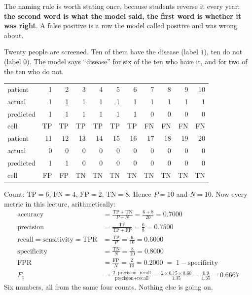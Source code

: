 \documentclass[11pt]{article}
\newcommand{\TP}{\mathrm{TP}}
\newcommand{\FP}{\mathrm{FP}}
\newcommand{\TN}{\mathrm{TN}}
\newcommand{\FN}{\mathrm{FN}}
\newcommand{\TPR}{\mathrm{TPR}}
\newcommand{\FPR}{\mathrm{FPR}}
\begin{document}
The naming rule is worth stating once, because students reverse it every year:
\textbf{the second word is what the model said, the first word is whether it was
right}. A false positive is a row the model called positive and was wrong about.

\begin{worked}
Twenty people are screened. Ten of them have the disease (label $1$), ten do
not (label $0$). The model says ``disease'' for six of the ten who have it, and
for two of the ten who do not.

\smallskip
\begin{center}\footnotesize
\begin{tabular}{@{}lrrrrrrrrrr@{}}
\toprule
patient  & 1&2&3&4&5&6&7&8&9&10\\
actual   & 1&1&1&1&1&1&1&1&1&1\\
predicted& 1&1&1&1&1&1&0&0&0&0\\
cell     & TP&TP&TP&TP&TP&TP&FN&FN&FN&FN\\
\midrule
patient  & 11&12&13&14&15&16&17&18&19&20\\
actual   & 0&0&0&0&0&0&0&0&0&0\\
predicted& 1&1&0&0&0&0&0&0&0&0\\
cell     & FP&FP&TN&TN&TN&TN&TN&TN&TN&TN\\
\bottomrule
\end{tabular}
\end{center}
\smallskip

Count: $\TP = 6$, $\FN = 4$, $\FP = 2$, $\TN = 8$. Hence $P = 10$ and $N = 10$.
Now every metric in this lecture, arithmetically:
\begin{align*}
\text{accuracy} &= \frac{\TP + \TN}{P + N} = \frac{6+8}{20} = 0.7000\\[2pt]
\text{precision} &= \frac{\TP}{\TP + \FP} = \frac{6}{8} = 0.7500\\[2pt]
\text{recall} = \text{sensitivity} = \TPR &= \frac{\TP}{P} = \frac{6}{10} = 0.6000\\[2pt]
\text{specificity} &= \frac{\TN}{N} = \frac{8}{10} = 0.8000\\[2pt]
\FPR &= \frac{\FP}{N} = \frac{2}{10} = 0.2000 \;=\; 1 - \text{specificity}\\[2pt]
F_1 &= \frac{2 \cdot \text{precision} \cdot \text{recall}}
             {\text{precision} + \text{recall}}
     = \frac{2 \times 0.75 \times 0.60}{1.35} = \frac{0.9}{1.35} = 0.6667
\end{align*}
Six numbers, all from the same four counts. Nothing else is going on.
\end{worked}
\end{document}
